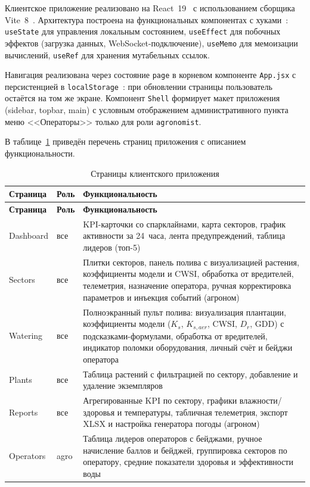 Клиентское приложение реализовано на
React~19~\cite{react_official,react_reference_hooks} с
использованием сборщика Vite~8~\cite{vite_official,vite_guide}.
Архитектура построена на функциональных компонентах с
хуками~\cite{react_reference_hooks}: \texttt{useState} для
управления локальным состоянием, \texttt{useEffect} для
побочных эффектов (загрузка данных, WebSocket-подключение),
\texttt{useMemo} для мемоизации вычислений,
\texttt{useRef} для хранения мутабельных ссылок.

Навигация реализована через состояние \texttt{page}
в корневом компоненте \texttt{App.jsx} с персистенцией
в \texttt{localStorage}~\cite{mdn_webstorage}: при
обновлении страницы пользователь остаётся на том же
экране. Компонент \texttt{Shell} формирует макет приложения
(sidebar, topbar, main) с условным отображением
административного пункта меню <<Операторы>> только для
роли \texttt{agronomist}.

В таблице~\ref{tab:pages} приведён перечень страниц
приложения с описанием функциональности.

\begin{longtable}{|l|l|p{6.2cm}|}
    \caption{Страницы клиентского приложения} \label{tab:pages} \\

    \hline
    \textbf{Страница} & \textbf{Роль} & \textbf{Функциональность} \\ \hline
    \endfirsthead

    \tabcont{\ref{tab:pages}}
    \textbf{Страница} & \textbf{Роль} & \textbf{Функциональность} \\ \hline
    \endhead

    \hline
    \endfoot

    Dashboard & все & KPI-карточки со спарклайнами, карта секторов, график активности за 24~часа, лента предупреждений, таблица лидеров (топ-5) \\ \hline
    Sectors   & все & Плитки секторов, панель полива с визуализацией растения, коэффициенты модели и CWSI, обработка от вредителей, телеметрия, назначение оператора, ручная корректировка параметров и инъекция событий (агроном) \\ \hline
    Watering  & все & Полноэкранный пульт полива: визуализация плантации, коэффициенты модели ($K_s$, $K_{s,aer}$, CWSI, $D_r$, GDD) с подсказками-формулами, обработка от вредителей, индикатор поломки оборудования, личный счёт и бейджи оператора \\ \hline
    Plants    & все & Таблица растений с фильтрацией по сектору, добавление и удаление экземпляров \\ \hline
    Reports   & все & Агрегированные KPI по сектору, графики влажности/здоровья и температуры, табличная телеметрия, экспорт XLSX и настройка генератора погоды (агроном) \\ \hline
    Operators & agro & Таблица лидеров операторов с бейджами, ручное начисление баллов и бейджей, группировка секторов по оператору, средние показатели здоровья и эффективности воды \\ \hline
\end{longtable}


